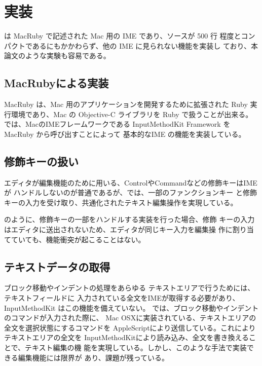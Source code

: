 \section{実装}

{\system} は MacRuby で記述された Mac 用の IME であり、ソースが 500 行
程度とコンパクトであるにもかかわらず、他の IME に見られない機能を実装し
ており、本論文のような実験も容易である。

\subsection{MacRubyによる実装}

MacRuby は、Mac 用のアプリケーションを開発するために拡張された Ruby 実
行環境であり、Mac の Objective-C ライブラリを Ruby で扱うことが出来る。
%
{\system} では、MacのIMEフレームワークである
InputMethodKit Framework を MacRuby から呼び出すことによって
基本的なIME の機能を実装している。

\subsection{修飾キーの扱い}

エディタが編集機能のために用いる、ControlやCommandなどの修飾キーはIMEが
ハンドルしないのが普通であるが、{\system}では、一部のファンクションキー
と修飾キーの入力を受け取り、共通化されたテキスト編集操作を実現している。

{\system} のように、修飾キーの一部をハンドルする実装を行った場合、修飾
キーの入力はエディタに送出されないため、エディタが同じキー入力を編集操
作に割り当てていても、機能衝突が起こることはない。

\subsection{テキストデータの取得}

ブロック移動やインデントの処理をあらゆる テキストエリアで行うためには、
テキストフィールドに 入力されている全文をIMEが取得する必要があり、
InputMethodKit はこの機能を備えていない。
%
{\system} では、ブロック移動やインデントのコマンドが入力された際に、
Mac OSXに実装されている、テキストエリアの全文を選択状態にするコマンドを
AppleScriptにより送信している。これによりテキストエリアの全文を
InputMethodKitにより読み込み、全文を書き換えることで、テキスト編集の機
能を実現している。しかし、このような手法で実装できる編集機能には限界が
あり、課題が残っている。
